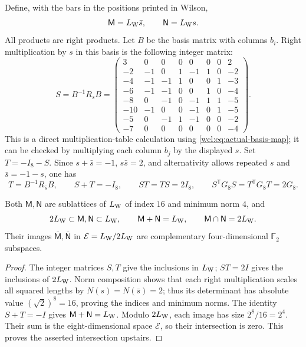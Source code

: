 Define, with the bars in the positions printed in Wilson,
\[
 \mathsf M=L_{\rm W}\bar s,\qquad \mathsf N=L_{\rm W}s .
\]
All products are right products. Let $B$ be the basis matrix with
columns $b_i$. Right multiplication by $s$ in this basis is the
following integer matrix:
\begin{equation}
 S=B^{-1}R_s B=
 \begin{pmatrix}
 3&0&0&0&0&0&0&2\\
 -2&-1&0&1&-1&1&0&-2\\
 -4&-1&-1&1&0&0&1&-3\\
 -6&-1&-1&0&0&1&0&-4\\
 -8&0&-1&0&-1&1&1&-5\\
 -10&-1&0&0&-1&0&1&-5\\
 -5&0&-1&1&-1&0&0&-2\\
 -7&0&0&0&0&0&0&-4
 \end{pmatrix}.
 \label{wcl:eq:S}
\end{equation}
This is a direct multiplication-table calculation using
\eqref{wcl:eq:actual-basis-map}; it can be checked by multiplying each
column $b_j$ by the displayed $s$. Set $T=-I_8-S$. Since
$s+\bar s=-1$, $s\bar s=2$, and alternativity allows repeated $s$
and $\bar s= -1-s$, one has
\begin{equation}
 T=B^{-1}R_{\bar s}B,\qquad S+T=-I_8,\qquad ST=TS=2I_8,
 \qquad S^{\mathsf T}G_8S=T^{\mathsf T}G_8T=2G_8 .
 \label{wcl:eq:ST-identities}
\end{equation}

\begin{lemma}\label{wcl:lem:complementary}
Both $\mathsf M,\mathsf N$ are sublattices of $L_{\rm W}$ of index
$16$ and minimum norm $4$, and
\[
 2L_{\rm W}\subset\mathsf M,\mathsf N\subset L_{\rm W},\qquad
 \mathsf M+\mathsf N=L_{\rm W},\qquad
 \mathsf M\cap\mathsf N=2L_{\rm W}.
\]
Their images $\overline{\mathsf M},\overline{\mathsf N}$ in
$\mathcal E=L_{\rm W}/2L_{\rm W}$ are complementary
four-dimensional $\mathbb F_2$ subspaces.
\end{lemma}

\begin{proof}
The integer matrices $S,T$ give the inclusions in $L_{\rm W}$;
$ST=2I$ gives the inclusions of $2L_{\rm W}$.
Norm composition shows that each right multiplication scales all
squared lengths by $N(s)=N(\bar s)=2$; thus its determinant has
absolute value $(\sqrt2)^8=16$, proving the indices and minimum norms.
The identity $S+T=-I$ gives $\mathsf M+\mathsf N=L_{\rm W}$.
Modulo $2L_{\rm W}$, each image has size $2^8/16=2^4$.
Their sum is the eight-dimensional space $\mathcal E$, so their
intersection is zero. This proves the asserted intersection upstairs.
\end{proof}

